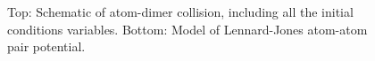 \documentclass[%
 reprint,
 amsmath,amssymb,
 aps,
 nofootinbib
]{revtex4-1}
\begin{document}
\begin{figure}[htp]


\caption{Top: Schematic of atom-dimer collision, including all the initial conditions variables. Bottom: Model of Lennard-Jones atom-atom pair potential.}
\label{fig:schematic}
\end{figure}
\end{document}
